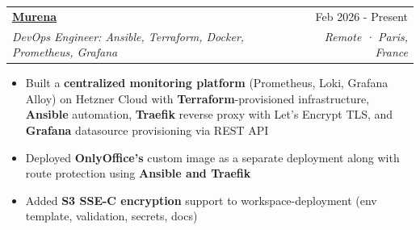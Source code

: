 \documentclass[letterpaper,11pt]{article}
\makeatletter
\newcommand{\resumeItem}[1]{
  \item\small{
    {#1 \vspace{-2pt}}
  }
}
\newcommand{\resumeSubheading}[4]{
  \vspace{-2pt}\item
    \begin{tabular*}{0.97\textwidth}[t]{l@{\extracolsep{\fill}}r}
      \textbf{#1} & #2 \\
      \textit{\small#3} & \textit{\small #4} \\
    \end{tabular*}\vspace{-7pt}
}
\newcommand{\resumeItemListStart}{\begin{itemize}}
\newcommand{\resumeItemListEnd}{\end{itemize}\vspace{-5pt}}
\makeatother
\begin{document}
 \resumeSubheading
  {\href{https://murena.io}{\underline{Murena}}}{Feb 2026 - Present}
  {DevOps Engineer: Ansible, Terraform, Docker, Prometheus, Grafana}{Remote · Paris, France}
  \resumeItemListStart                                                                                                                                                                                                                                                                    
    \resumeItem{Built a \textbf{centralized monitoring platform} (Prometheus, Loki, Grafana Alloy) on Hetzner Cloud with \textbf{Terraform}-provisioned infrastructure, \textbf{Ansible} automation, \textbf{Traefik} reverse proxy with Let's Encrypt TLS, and \textbf{Grafana}          
  datasource provisioning via REST API}                                                                                                                                                                        
    \resumeItem{Deployed \textbf{OnlyOffice's} custom image as a separate deployment along with route protection using \textbf{Ansible and Traefik}}                                                                                                                                     
    \resumeItem{Added \textbf{S3 SSE-C encryption} support to workspace-deployment (env template, validation, secrets, docs)}                                                                                                                                                     
  \resumeItemListEnd                                                                                                                                                                                                                                                                      
 
\end{document}

